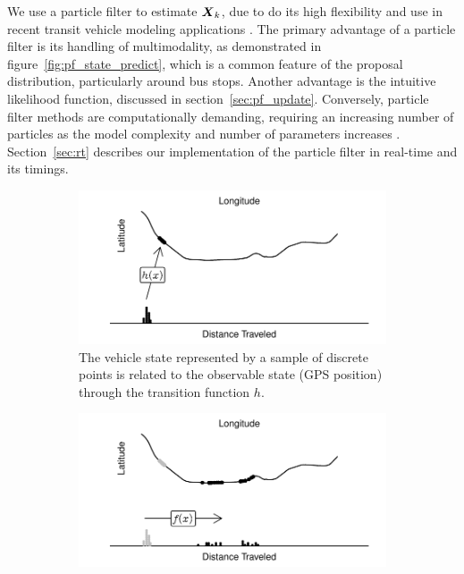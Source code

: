 We use a particle filter to estimate $\mbox{$\boldsymbol{X}$}_k$,
due to do its high flexibility and use in recent 
transit vehicle modeling applications \citep{Hans_2015}.
The primary advantage of a particle filter is its handling of multimodality,
as demonstrated in figure~\ref{fig:pf_state_predict},
which is a common feature of the proposal distribution, particularly around bus stops.
Another advantage is the intuitive likelihood function, 
discussed in section~\ref{sec:pf_update}.
Conversely, particle filter methods are computationally demanding,
requiring an increasing number of particles as the model complexity and
number of parameters increases \citep{Carpenter_1999}.
Section~\ref{sec:rt} describes our implementation of the particle filter in real-time 
and its timings.



\begin{figure}[tb]
    \centering
    \begin{subfigure}[t]{0.48\textwidth}
        \centering
        \includegraphics[width=\textwidth]{figures/03_particle_filter_1.pdf}
        \caption{The vehicle state represented by a sample of discrete points is related to the observable state (GPS position) through the transition function $h$.}
        \label{fig:pf_state_prev}
    \end{subfigure}\;\;
    \begin{subfigure}[t]{0.48\textwidth}
        \centering
        \includegraphics[width=\textwidth]{figures/03_particle_filter_2.pdf}

\end{subfigure}
\end{figure}
